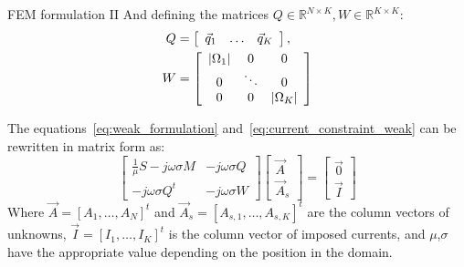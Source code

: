 \documentclass[aspectratio=54,xcolor=dvipsnames]{beamer}
\begin{document}
\begin{frame}{FEM formulation II}
    And defining the matrices $Q \in \mathbb{R}^{N \times K}, W \in \mathbb{R}^{K \times K}$:
    \begin{align*}
        Q &= \left[
        \begin{array}{ccc}
            \vec{q}_1 & \ldots & \vec{q}_K 
        \end{array}
        \right], \\
        W &= \left[
        \begin{array}{ccc}
            \abs{\Omega_1} & 0 & 0 \\
            0 & \ddots & 0 \\
            0 & 0 & \abs{\Omega_K}
        \end{array}
        \right]
    \end{align*}

    The equations~\eqref{eq:weak_formulation} and~\eqref{eq:current_constraint_weak} can be rewritten in matrix form as:
    \begin{equation}
        \left[
        \begin{array}{cc}
            \frac{1}{\mu} S - j\omega \sigma M & -j\omega \sigma Q\\
            -j\omega \sigma Q^t & -j\omega \sigma W 
        \end{array}
        \right]
        \left[
        \begin{array}{c}
            \vec{A} \\
            \vec{A}_{s}
        \end{array}
        \right]
        =
        \left[
        \begin{array}{c}
            \vec{0} \\
            \vec{I} 
        \end{array}
        \right]
    \end{equation}
    Where $\vec{A} = [A_1, \ldots, A_N]^t$ and $\vec{A}_s = [A_{s,1}, \ldots, A_{s,K}]^t$ are the column vectors of unknowns, $\vec{I} = [I_1, \ldots, I_K]^t$ is the column vector of imposed currents, and $\mu$,$\sigma$ have the appropriate value depending on the position in the domain.
\end{frame}
\end{document}

